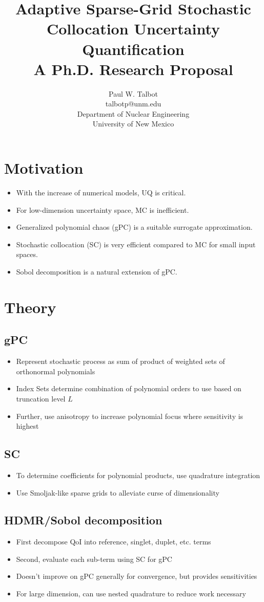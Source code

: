 \documentclass{article}
\title{Adaptive Sparse-Grid Stochastic Collocation Uncertainty Quantification \\ \vspace{10pt}\normalsize A Ph.D. Research Proposal}
\author{Paul W. Talbot\\talbotp@unm.edu\\Department of Nuclear Engineering\\University of New Mexico}
\begin{document}
\maketitle
\section{Motivation}
\begin{itemize}
\item With the increase of numerical models, UQ is critical.
\item For low-dimension uncertainty space, MC is inefficient.
\item Generalized polynomial chaos (gPC) is a suitable surrogate approximation.
\item Stochastic collocation (SC) is very efficient compared to MC for small input spaces.
\item Sobol decomposition is a natural extension of gPC.
\end{itemize}

\section{Theory}
\subsection{gPC}
  \begin{itemize}
  \item Represent stochastic process as sum of product of weighted sets of orthonormal polynomials
  \item Index Sets determine combination of polynomial orders to use based on truncation level $L$
  \item Further, use anisotropy to increase polynomial focus where sensitivity is highest
  \end{itemize}
\subsection{SC}
  \begin{itemize}
  \item To determine coefficients for polynomial products, use quadrature integration
  \item Use Smoljak-like sparse grids to alleviate curse of dimensionality
  \end{itemize}
\subsection{HDMR/Sobol decomposition}
  \begin{itemize}
  \item First decompose QoI into reference, singlet, duplet, etc. terms
  \item Second, evaluate each sub-term using SC for gPC
  \item Doesn't improve on gPC generally for convergence, but provides sensitivities
  \item For large dimension, can use nested quadrature to reduce work necessary
  \end{itemize}
\end{document}
